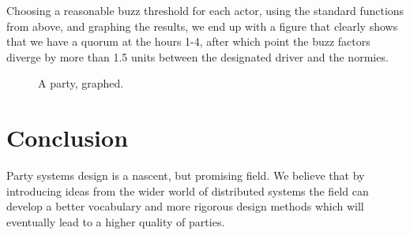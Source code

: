 \documentclass[twocolumn]{article}
\begin{document}
Choosing a reasonable buzz threshold for each actor, using the standard
functions from above, and graphing the results, we end up with a figure that
clearly shows that we have a quorum at the hours 1-4, after which point the
buzz factors diverge by more than 1.5 units between the designated driver and
the normies.

\begin{figure}[H]
\caption{A party, graphed.}
\end{figure}

\section{Conclusion}

Party systems design is a nascent, but promising field. We believe that by
introducing ideas from the wider world of distributed systems the field can
develop a better vocabulary and more rigorous design methods which will
eventually lead to a higher quality of parties.


\end{document}
